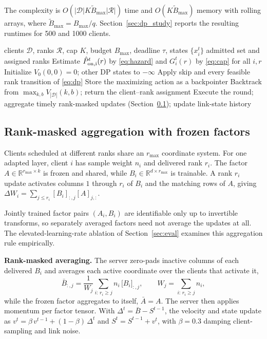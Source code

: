 \documentclass[preprint,12pt]{elsarticle}
\begin{document}
The complexity is $O(|\mathcal D|K\widetilde B_{\max}|\mathcal R|)$ time and $O(K\widetilde B_{\max})$ memory with rolling arrays, where $\widetilde B_{\max}=B_{\max}/q$. Section~\ref{sec:dp_study} reports the resulting runtimes for 500 and 1000 clients.

\begin{algorithm}[t]
\caption{FedRAS scheduling round}
\label{alg:scheduler}
\begin{algorithmic}[1]
\REQUIRE clients $\mathcal D$, ranks $\mathcal R$, cap $K$, budget $B_{\max}$, deadline $\tau$, states $\{x_i^t\}$
\ENSURE admitted set and assigned ranks
\STATE Estimate $\hat P_{\rm on,i}^t(r)$ by \eqref{eq:hazard} and $G_i^t(r)$ by \eqref{eq:cap} for all $i,r$
\STATE Initialize $V_0(0,0)=0$; other DP states to $-\infty$
    \STATE Apply skip and every feasible rank transition of \eqref{eq:dp}
    \STATE Store the maximizing action as a backpointer
  \ENDFOR
\ENDFOR
\STATE Backtrack from $\max_{k,b} V_{|\mathcal D|}(k,b)$; return the client--rank assignment
\STATE Execute the round; aggregate timely rank-masked updates (Section~\ref{sec:aggregation}); update link-state history
\end{algorithmic}
\end{algorithm}

\subsection{Rank-masked aggregation with frozen factors}
\label{sec:aggregation}
Clients scheduled at different ranks share an $r_{\max}$ coordinate system. For one adapted layer, client $i$ has sample weight $n_i$ and delivered rank $r_i$. The factor $A\in\mathbb R^{r_{\max}\times k}$ is frozen and shared, while $B_i\in\mathbb R^{d\times r_{\max}}$ is trainable. A rank $r_i$ update activates columns $1$ through $r_i$ of $B_i$ and the matching rows of $A$, giving $\Delta W_i=\sum_{j\le r_i}[B_i]_{:,j}[A]_{j,:}$.

Jointly trained factor pairs $(A_i,B_i)$ are identifiable only up to invertible transforms, so separately averaged factors need not average the updates at all. The elevated-learning-rate ablation of Section~\ref{sec:eval} examines this aggregation rule empirically.

\textbf{Rank-masked averaging.} The server zero-pads inactive columns of each delivered $B_i$ and averages each active coordinate over the clients that activate it,
\begin{equation}
\bar B_{:,j}=\frac{1}{W_j}\sum_{i:\,r_i\ge j} n_i\,\big[B_i\big]_{:,j},
\qquad
W_j=\sum_{i:\,r_i\ge j} n_i ,
\label{eq:maskavg}
\end{equation}
while the frozen factor aggregates to itself, $\bar A=A$. The server then applies momentum per factor tensor. With $\Delta^t=\bar B-S^{t-1}$, the velocity and state update as $v^t=\beta\,v^{t-1}+(1-\beta)\,\Delta^t$ and $S^t=S^{t-1}+v^t$, with $\beta=0.3$ damping client-sampling and link noise.
\end{document}
